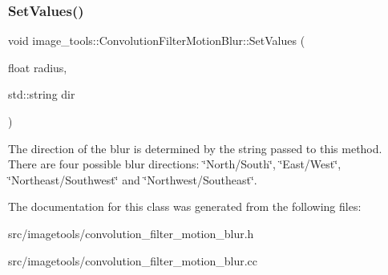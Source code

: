 \subsubsection{\texorpdfstring{Set\+Values()}{SetValues()}}
{\footnotesize\ttfamily void image\+\_\+tools\+::\+Convolution\+Filter\+Motion\+Blur\+::\+Set\+Values (\begin{DoxyParamCaption}\item[{float}]{radius,  }\item[{std\+::string}]{dir }\end{DoxyParamCaption})}

The direction of the blur is determined by the string passed to this method. There are four possible blur directions\+: \char`\"{}\+North/\+South\char`\"{}, \char`\"{}\+East/\+West\char`\"{}, \char`\"{}\+Northeast/\+Southwest\char`\"{} and \char`\"{}\+Northwest/\+Southeast\char`\"{}. 

The documentation for this class was generated from the following files\+:\begin{DoxyCompactItemize}
\item 
src/imagetools/convolution\+\_\+filter\+\_\+motion\+\_\+blur.\+h\item 
src/imagetools/convolution\+\_\+filter\+\_\+motion\+\_\+blur.\+cc\end{DoxyCompactItemize}
